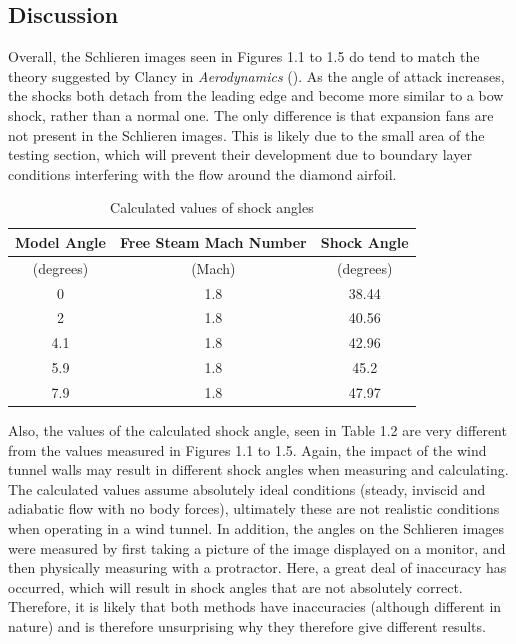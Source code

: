 \documentclass[stu, a4paper, 12pt, floatsintext]{apa7}
\numberwithin{figure}{section}
\numberwithin{table}{section}
\numberwithin{equation}{section}
\begin{document}
\subsection{Discussion}
Overall, the Schlieren images seen in Figures 1.1 to 1.5 do tend to match the theory suggested by Clancy in \textit{Aerodynamics} (\cite{Clancy1986}). As the angle of attack increases, the shocks both detach from the leading edge and become more similar to a bow shock, rather than a normal one. The only difference is that expansion fans are not present in the Schlieren images. This is likely due to the small area of the testing section, which will prevent their development due to boundary layer conditions interfering with the flow around the diamond airfoil. 
\begin{table}[H]
    \centering
    \caption{Calculated values of shock angles}
    \label{tab:aero_shock_angles}
    \begin{tabular}{@{}ccc@{}}
    \toprule
    \textbf{Model   Angle} & \textbf{Free Steam Mach Number} & \textbf{Shock Angle} \\ \midrule
    (degrees)              & (Mach)                          & (degrees)            \\
    0                      & 1.8                             & 38.44                \\
    2                      & 1.8                             & 40.56                \\
    4.1                    & 1.8                             & 42.96                \\
    5.9                    & 1.8                             & 45.2                 \\
    7.9                    & 1.8                             & 47.97                \\ \bottomrule
    \end{tabular}
\end{table}
Also, the values of the calculated shock angle, seen in Table 1.2 are very different from the values measured in Figures 1.1 to 1.5. Again, the impact of the wind tunnel walls may result in different shock angles when measuring and calculating. The calculated values assume absolutely ideal conditions (steady, inviscid and adiabatic flow with no body forces), ultimately these are not realistic conditions when operating in a wind tunnel. In addition, the angles on the Schlieren images were measured by first taking a picture of the image displayed on a monitor, and then physically measuring with a protractor. Here, a great deal of inaccuracy has occurred, which will result in shock angles that are not absolutely correct. Therefore, it is likely that both methods have inaccuracies (although different in nature) and is therefore unsurprising why they therefore give different results.
\end{document}
